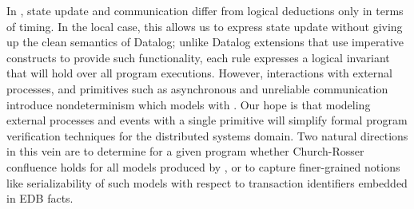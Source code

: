 
In \lang, state update and communication differ from logical
deductions only in terms of timing.
In the local case, this allows us to express state update without giving up the clean semantics of Datalog; unlike
Datalog extensions that use imperative constructs to provide such
functionality, each \lang rule expresses a logical invariant that will
hold over all program executions.  
However, interactions with external processes, and primitives such as
asynchronous and unreliable communication introduce nondeterminism
which \lang models with .  
Our hope is that modeling external processes and events with a single
primitive will simplify formal program verification techniques for the distributed systems domain.  Two natural directions in this vein are to determine for a given \lang program whether Church-Rosser confluence holds for all models produced by , or to capture finer-grained notions like serializability of such models with respect to transaction identifiers embedded in EDB facts.  
% 
% 




